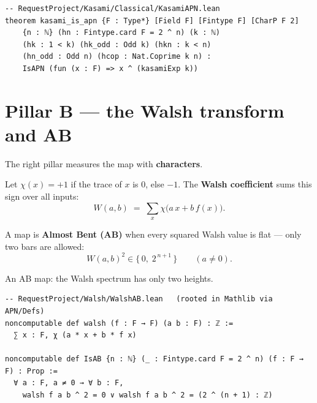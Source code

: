 \documentclass[11pt]{article}
\begin{document}
\begin{lstlisting}
-- RequestProject/Kasami/Classical/KasamiAPN.lean
theorem kasami_is_apn {F : Type*} [Field F] [Fintype F] [CharP F 2]
    {n : ℕ} (hn : Fintype.card F = 2 ^ n) (k : ℕ)
    (hk : 1 < k) (hk_odd : Odd k) (hkn : k < n)
    (hn_odd : Odd n) (hcop : Nat.Coprime k n) :
    IsAPN (fun (x : F) => x ^ (kasamiExp k))
\end{lstlisting}

\section{Pillar B --- the Walsh transform and AB}

The right pillar measures the map with \textbf{characters}.

Let $\chi(x) = +1$ if the trace of $x$ is $0$, else $-1$.
The \textbf{Walsh coefficient} sums this sign over all inputs:
\[
  W(a,b) \;=\; \sum_{x} \chi\bigl(a\,x + b\,f(x)\bigr).
\]

A map is \textbf{Almost Bent (AB)} when every squared Walsh value is flat ---
only two bars are allowed:
\[
  W(a,b)^2 \in \{\,0,\; 2^{\,n+1}\,\} \qquad (a \neq 0).
\]

\begin{center}

{\small An AB map: the Walsh spectrum has only two heights.}
\end{center}

\begin{lstlisting}
-- RequestProject/Walsh/WalshAB.lean   (rooted in Mathlib via APN/Defs)
noncomputable def walsh (f : F → F) (a b : F) : ℤ :=
  ∑ x : F, χ (a * x + b * f x)

noncomputable def IsAB {n : ℕ} (_ : Fintype.card F = 2 ^ n) (f : F → F) : Prop :=
  ∀ a : F, a ≠ 0 → ∀ b : F,
    walsh f a b ^ 2 = 0 ∨ walsh f a b ^ 2 = (2 ^ (n + 1) : ℤ)
\end{lstlisting}
\end{document}
